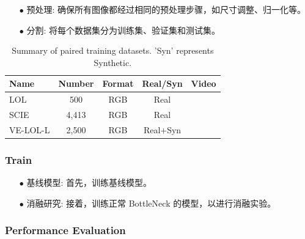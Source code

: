 \documentclass[a4paper, 10pt]{article}
\begin{document}
		\begin{itemize}
			\item [$\bullet$]
			预处理: 确保所有图像都经过相同的预处理步骤，如尺寸调整、归一化等。
			
			\item [$\bullet$]
			分割: 将每个数据集分为训练集、验证集和测试集。
		\end{itemize}
		
		\begin{table}[!htbp]
			\centering
			\tiny
				\begin{tabular}{>{\centering\arraybackslash}m{2.5cm}|c|c|c|c}
					
					\hline
					
					\textbf{Name} & \textbf{Number} & \textbf{Format} & \textbf{Real/Syn} & \textbf{Video} \\
					
					\hline
					
					LOL\cite{wei2018deep} & 500 & RGB & Real & \\
					
					SCIE\cite{cai2018learning} & 4,413 & RGB & Real & \\
					
					VE-LOL-L\cite{jiang2019learning} & 2,500 & RGB & Real+Syn & \\
					
					\hline
					
				\end{tabular}
			\captionsetup{font=scriptsize} %
			\caption{\label{tab: Paired_training_datases}
				Summary of paired training datasets. 'Syn' represents Synthetic.} %
			
		\end{table}
		
		\subsubsection{Train}
		
		\begin{itemize}
			\item [$\bullet$]
			基线模型: 首先，训练基线模型。
			
			\item [$\bullet$]
			消融研究: 接着，训练正常 BottleNeck 的模型，以进行消融实验。
		\end{itemize}
		
		\subsubsection{Performance Evaluation}
		
\end{document}
